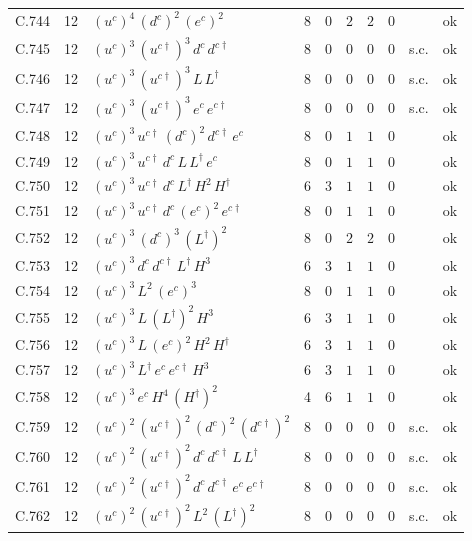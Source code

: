 {\begin{longtable}{@{}ll>{\raggedright\arraybackslash}p{6.4cm}rrllllr@{}}
C.744 & 12 & $(u^c)^{4}\,(d^c)^{2}\,(e^c)^{2}$ & 8 & 0 & $2$ & $2$ & $0$ &  & ok \\
C.745 & 12 & $(u^c)^{3}\,(u^{c\dagger})^{3}\,d^c\,d^{c\dagger}$ & 8 & 0 & $0$ & $0$ & $0$ & s.c. & ok \\
C.746 & 12 & $(u^c)^{3}\,(u^{c\dagger})^{3}\,L\,L^\dagger$ & 8 & 0 & $0$ & $0$ & $0$ & s.c. & ok \\
C.747 & 12 & $(u^c)^{3}\,(u^{c\dagger})^{3}\,e^c\,e^{c\dagger}$ & 8 & 0 & $0$ & $0$ & $0$ & s.c. & ok \\
C.748 & 12 & $(u^c)^{3}\,u^{c\dagger}\,(d^c)^{2}\,d^{c\dagger}\,e^c$ & 8 & 0 & $1$ & $1$ & $0$ &  & ok \\
C.749 & 12 & $(u^c)^{3}\,u^{c\dagger}\,d^c\,L\,L^\dagger\,e^c$ & 8 & 0 & $1$ & $1$ & $0$ &  & ok \\
C.750 & 12 & $(u^c)^{3}\,u^{c\dagger}\,d^c\,L^\dagger\,H^{2}\,H^\dagger$ & 6 & 3 & $1$ & $1$ & $0$ &  & ok \\
C.751 & 12 & $(u^c)^{3}\,u^{c\dagger}\,d^c\,(e^c)^{2}\,e^{c\dagger}$ & 8 & 0 & $1$ & $1$ & $0$ &  & ok \\
C.752 & 12 & $(u^c)^{3}\,(d^c)^{3}\,(L^\dagger)^{2}$ & 8 & 0 & $2$ & $2$ & $0$ &  & ok \\
C.753 & 12 & $(u^c)^{3}\,d^c\,d^{c\dagger}\,L^\dagger\,H^{3}$ & 6 & 3 & $1$ & $1$ & $0$ &  & ok \\
C.754 & 12 & $(u^c)^{3}\,L^{2}\,(e^c)^{3}$ & 8 & 0 & $1$ & $1$ & $0$ &  & ok \\
C.755 & 12 & $(u^c)^{3}\,L\,(L^\dagger)^{2}\,H^{3}$ & 6 & 3 & $1$ & $1$ & $0$ &  & ok \\
C.756 & 12 & $(u^c)^{3}\,L\,(e^c)^{2}\,H^{2}\,H^\dagger$ & 6 & 3 & $1$ & $1$ & $0$ &  & ok \\
C.757 & 12 & $(u^c)^{3}\,L^\dagger\,e^c\,e^{c\dagger}\,H^{3}$ & 6 & 3 & $1$ & $1$ & $0$ &  & ok \\
C.758 & 12 & $(u^c)^{3}\,e^c\,H^{4}\,(H^\dagger)^{2}$ & 4 & 6 & $1$ & $1$ & $0$ &  & ok \\
C.759 & 12 & $(u^c)^{2}\,(u^{c\dagger})^{2}\,(d^c)^{2}\,(d^{c\dagger})^{2}$ & 8 & 0 & $0$ & $0$ & $0$ & s.c. & ok \\
C.760 & 12 & $(u^c)^{2}\,(u^{c\dagger})^{2}\,d^c\,d^{c\dagger}\,L\,L^\dagger$ & 8 & 0 & $0$ & $0$ & $0$ & s.c. & ok \\
C.761 & 12 & $(u^c)^{2}\,(u^{c\dagger})^{2}\,d^c\,d^{c\dagger}\,e^c\,e^{c\dagger}$ & 8 & 0 & $0$ & $0$ & $0$ & s.c. & ok \\
C.762 & 12 & $(u^c)^{2}\,(u^{c\dagger})^{2}\,L^{2}\,(L^\dagger)^{2}$ & 8 & 0 & $0$ & $0$ & $0$ & s.c. & ok \\

\end{longtable}}
